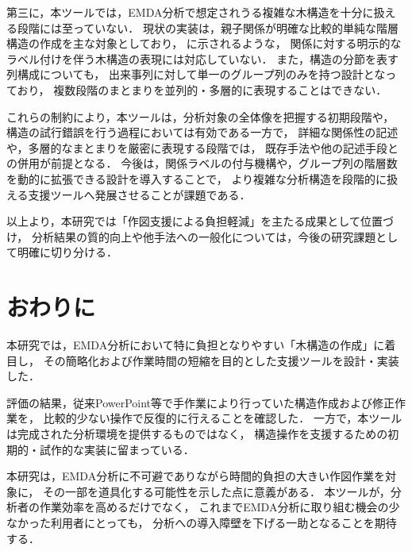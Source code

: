 第三に，本ツールでは，EMDA分析で想定されうる複雑な木構造を十分に扱える段階には至っていない．
現状の実装は，親子関係が明確な比較的単純な階層構造の作成を主な対象としており，
\cite{emdahomuratatu, emda3aho} に示されるような，
関係に対する明示的なラベル付けを伴う木構造の表現には対応していない．
また，構造の分節を表す列構成についても，
出来事列に対して単一のグループ列のみを持つ設計となっており，
複数段階のまとまりを並列的・多層的に表現することはできない．

これらの制約により，本ツールは，分析対象の全体像を把握する初期段階や，
構造の試行錯誤を行う過程においては有効である一方で，
詳細な関係性の記述や，多層的なまとまりを厳密に表現する段階では，
既存手法や他の記述手段との併用が前提となる．
今後は，関係ラベルの付与機構や，グループ列の階層数を動的に拡張できる設計を導入することで，
より複雑な分析構造を段階的に扱える支援ツールへ発展させることが課題である．

以上より，本研究では「作図支援による負担軽減」を主たる成果として位置づけ，
分析結果の質的向上や他手法への一般化については，今後の研究課題として明確に切り分ける．

\section{おわりに}

本研究では，EMDA分析において特に負担となりやすい「木構造の作成」に着目し，
その簡略化および作業時間の短縮を目的とした支援ツールを設計・実装した．

評価の結果，従来PowerPoint等で手作業により行っていた構造作成および修正作業を，
比較的少ない操作で反復的に行えることを確認した．
一方で，本ツールは完成された分析環境を提供するものではなく，
構造操作を支援するための初期的・試作的な実装に留まっている．

本研究は，EMDA分析に不可避でありながら時間的負担の大きい作図作業を対象に，
その一部を道具化する可能性を示した点に意義がある．
本ツールが，分析者の作業効率を高めるだけでなく，
これまでEMDA分析に取り組む機会の少なかった利用者にとっても，
分析への導入障壁を下げる一助となることを期待する．

